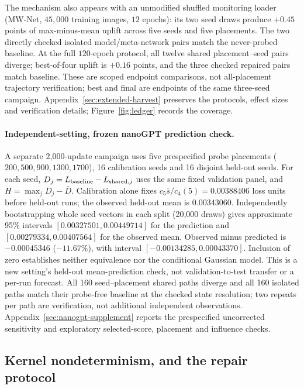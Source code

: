 The mechanism also appears with an unmodified shuffled monitoring loader
(MW-Net, $45{,}000$ training images, $12$ epochs): its two seed draws
produce $+0.45$ points of max-minus-mean uplift across five seeds and five
placements. The two directly checked isolated model/meta-network pairs
match the never-probed baseline. At the full $120$-epoch protocol,
all twelve shared placement--seed pairs diverge; best-of-four uplift is
$+0.16$ points, and the three checked repaired pairs match baseline.
These are scoped endpoint comparisons, not all-placement trajectory
verification; best and final are endpoints of the same three-seed campaign.
Appendix~\ref{sec:extended-harvest} preserves the protocols, effect sizes
and verification details; Figure~\ref{fig:ledger} records the coverage.

\paragraph{Independent-setting, frozen nanoGPT prediction check.}
A separate 2,000-update campaign uses five prespecified probe placements
($200,500,900,1300,1700$), 16 calibration seeds and 16 disjoint held-out seeds.
For each seed, $D_j=L_{\rm baseline}-L_{{\rm shared},j}$ uses the same fixed
validation panel, and $H=\max_jD_j-\bar D$. Calibration alone fixes
$c_5\overline{s}/c_4(5)=0.00388406$ loss units before held-out runs;
the observed held-out mean is $0.00343060$. Independently bootstrapping
whole seed vectors in each split (20,000 draws) gives approximate 95\%
intervals $[0.00327501,0.00449714]$ for the prediction and
$[0.00279334,0.00407564]$ for the observed mean. Observed minus predicted
is $-0.00045346$ ($-11.67\%$), with interval
$[-0.00134285,0.00043370]$. Inclusion of zero establishes neither equivalence
nor the conditional Gaussian model. This is a new setting's held-out
mean-prediction check, not validation-to-test transfer or a per-run forecast.
All 160 seed--placement shared paths diverge and all 160 isolated paths
match their probe-free baseline at the checked state resolution; two
repeats per path are verification, not additional independent observations.
Appendix~\ref{sec:nanogpt-supplement} reports the prespecified uncorrected
sensitivity and exploratory selected-score, placement and influence checks.

\subsection{Kernel nondeterminism, and the repair protocol}
\label{sec:repair}

